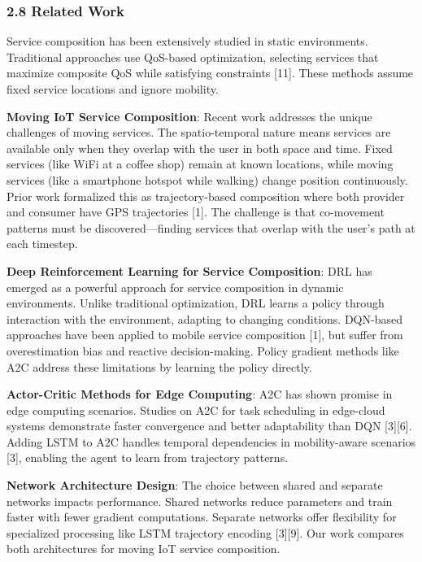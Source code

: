 \hypertarget{related-work}{%
	\subsubsection{2.8 Related Work}\label{related-work}}

Service composition has been extensively studied in static environments.
Traditional approaches use QoS-based optimization, selecting services
that maximize composite QoS while satisfying constraints {[}11{]}. These
methods assume fixed service locations and ignore mobility.

\textbf{Moving IoT Service Composition}: Recent work addresses the
unique challenges of moving services. The spatio-temporal nature means
services are available only when they overlap with the user in both
space and time. Fixed services (like WiFi at a coffee shop) remain at
known locations, while moving services (like a smartphone hotspot while
walking) change position continuously. Prior work formalized this as
trajectory-based composition where both provider and consumer have GPS
trajectories {[}1{]}. The challenge is that co-movement patterns must be
discovered---finding services that overlap with the user's path at each
timestep.

\textbf{Deep Reinforcement Learning for Service Composition}: DRL has
emerged as a powerful approach for service composition in dynamic
environments. Unlike traditional optimization, DRL learns a policy
through interaction with the environment, adapting to changing
conditions. DQN-based approaches have been applied to mobile service
composition {[}1{]}, but suffer from overestimation bias and reactive
decision-making. Policy gradient methods like A2C address these
limitations by learning the policy directly.

\textbf{Actor-Critic Methods for Edge Computing}: A2C has shown promise
in edge computing scenarios. Studies on A2C for task scheduling in
edge-cloud systems demonstrate faster convergence and better
adaptability than DQN {[}3{]}{[}6{]}. Adding LSTM to A2C handles
temporal dependencies in mobility-aware scenarios {[}3{]}, enabling the
agent to learn from trajectory patterns.

\textbf{Network Architecture Design}: The choice between shared and
separate networks impacts performance. Shared networks reduce parameters
and train faster with fewer gradient computations. Separate networks
offer flexibility for specialized processing like LSTM trajectory
encoding {[}3{]}{[}9{]}. Our work compares both architectures for moving
IoT service composition.

